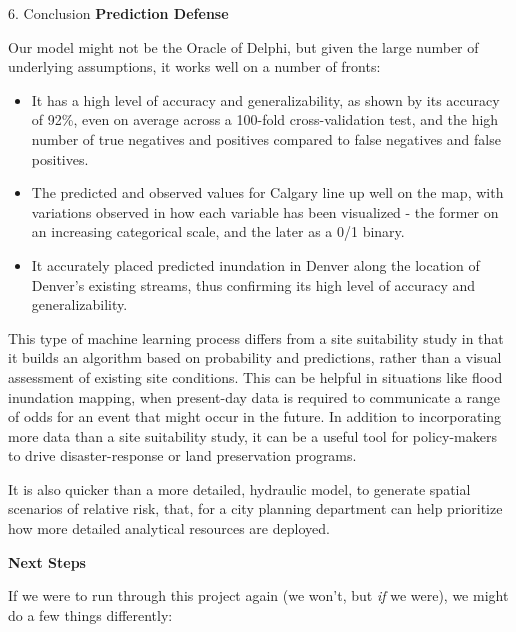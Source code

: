 \documentclass[
  ignorenonframetext,
]{beamer}
\begin{document}
\begin{frame}{6. Conclusion}
\protect\hypertarget{conclusion}{}
\textbf{Prediction Defense}

Our model might not be the Oracle of Delphi, but given the large number
of underlying assumptions, it works well on a number of fronts:

\begin{itemize}
\item
  It has a high level of accuracy and generalizability, as shown by its
  accuracy of 92\%, even on average across a 100-fold cross-validation
  test, and the high number of true negatives and positives compared to
  false negatives and false positives.
\item
  The predicted and observed values for Calgary line up well on the map,
  with variations observed in how each variable has been visualized -
  the former on an increasing categorical scale, and the later as a 0/1
  binary.
\item
  It accurately placed predicted inundation in Denver along the location
  of Denver's existing streams, thus confirming its high level of
  accuracy and generalizability.
\end{itemize}

This type of machine learning process differs from a site suitability
study in that it builds an algorithm based on probability and
predictions, rather than a visual assessment of existing site
conditions. This can be helpful in situations like flood inundation
mapping, when present-day data is required to communicate a range of
odds for an event that might occur in the future. In addition to
incorporating more data than a site suitability study, it can be a
useful tool for policy-makers to drive disaster-response or land
preservation programs.

It is also quicker than a more detailed, hydraulic model, to generate
spatial scenarios of relative risk, that, for a city planning department
can help prioritize how more detailed analytical resources are deployed.

\textbf{Next Steps}

If we were to run through this project again (we won't, but \emph{if} we
were), we might do a few things differently:


\end{frame}
\end{document}
